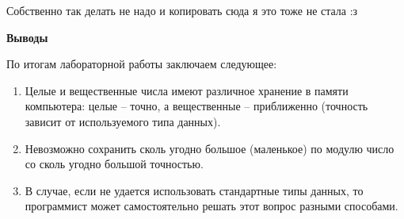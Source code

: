 \documentclass[a4paper, 12pt, -shell-escape]{article}  %
\begin{document}
	Собственно так делать не надо и копировать сюда я это тоже не стала :з
	
	\newpage
	\begin{center}
		\begin{large}
			\noindent\textbf{Выводы}\\
		\end{large}
	\end{center}
	По итогам лабораторной работы заключаем следующее: 
	\begin{enumerate} 
		\item Целые и вещественные числа имеют различное хранение в памяти компьютера: целые – точно, а вещественные – приближенно (точность зависит от используемого типа данных).
		\item  Невозможно сохранить сколь угодно большое (маленькое) по модулю число со сколь угодно большой точностью. 
		\item В случае, если не удается использовать стандартные типы данных, то программист может самостоятельно решать этот вопрос разными способами.
		
	\end{enumerate}

	
\end{document}
